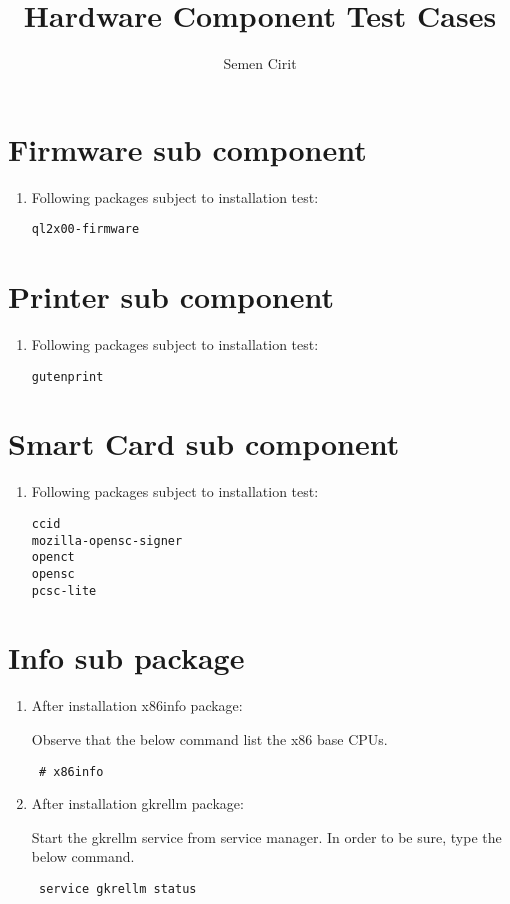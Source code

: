 \documentclass[a4paper,10pt]{article}
\title{Hardware Component Test Cases}
\author{Semen Cirit}
\begin{document}
\maketitle
\section{Firmware sub component}
\begin{enumerate}
 \item Following packages subject to installation test:
\begin{verbatim}
ql2x00-firmware
\end{verbatim}
\end{enumerate}

\section{Printer sub component}
\begin{enumerate}
 \item Following packages subject to installation test:
\begin{verbatim}
gutenprint 
\end{verbatim}


\end{enumerate}

\section{Smart Card sub component}
\begin{enumerate}
 \item Following packages subject to installation test:
\begin{verbatim}
ccid 
mozilla-opensc-signer
openct
opensc
pcsc-lite
\end{verbatim}


\end{enumerate}

\section{Info sub package}
\begin{enumerate}
 \item After installation x86info package:

Observe that the below command list the x86 base CPUs.
\begin{verbatim}
 # x86info
\end{verbatim}


 \item After installation gkrellm package:

Start the gkrellm service from service manager. In order to be sure, type the below command.

\begin{verbatim}
 service gkrellm status
\end{verbatim}

\end{enumerate}
\end{document}
